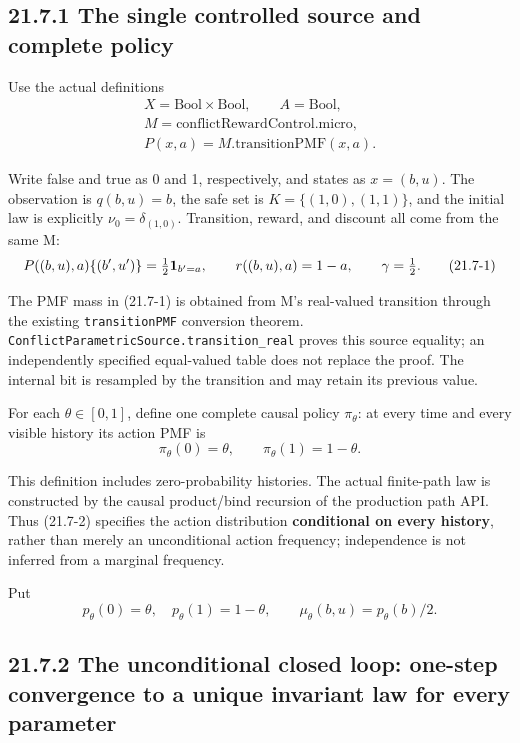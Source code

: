 \documentclass[
  english,
  11pt,
  oneside]{book}
\begin{document}
\subsection{21.7.1 The single controlled source and complete policy}\label{the-single-controlled-source-and-complete-policy}

Use the actual definitions \[\begin{gathered}
X=\mathrm{Bool}\times\mathrm{Bool},\qquad A=\mathrm{Bool},\\
M=\mathrm{conflictRewardControl.micro},\\
P(x,a)=M.\mathrm{transitionPMF}(x,a).
\end{gathered}\]

Write false and true as 0 and 1, respectively, and states as \(x=(b,u)\). The observation is \(q(b,u)=b\), the safe set is \(K=\{(1,0),(1,1)\}\), and the initial law is explicitly \(\nu_0=\delta_{(1,0)}\). Transition, reward, and discount all come from the same M: \[P((b,u),a)\{(b',u')\}=\tfrac12{\bf1}_{b'=a},\qquad
r((b,u),a)=1-a,\qquad \gamma=\tfrac12.                 \tag{21.7-1}\]

The PMF mass in (21.7-1) is obtained from M's real-valued transition through the existing \nolinkurl{transitionPMF} conversion theorem. \nolinkurl{ConflictParametricSource.transition_real} proves this source equality; an independently specified equal-valued table does not replace the proof. The internal bit is resampled by the transition and may retain its previous value.

For each \(\theta\in[0,1]\), define one complete causal policy \(\pi_\theta\): at every time and every visible history its action PMF is \[\pi_\theta(0)=\theta,\qquad \pi_\theta(1)=1-\theta.     \tag{21.7-2}\]

This definition includes zero-probability histories. The actual finite-path law is constructed by the causal product/bind recursion of the production path API. Thus (21.7-2) specifies the action distribution \textbf{conditional on every history}, rather than merely an unconditional action frequency; independence is not inferred from a marginal frequency.

Put \[p_\theta(0)=\theta,\quad p_\theta(1)=1-\theta,\qquad
\mu_\theta(b,u)=p_\theta(b)/2.\]

\subsection{21.7.2 The unconditional closed loop: one-step convergence to a unique invariant law for every parameter}\label{the-unconditional-closed-loop-one-step-convergence-to-a-unique-invariant-law-for-every-parameter}
\end{document}
